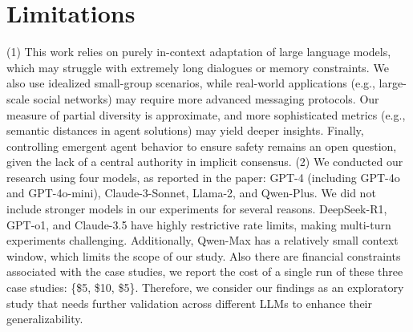 \section*{Limitations}
(1) This work relies on purely in-context adaptation of large language models, which may struggle with extremely long dialogues or memory constraints. We also use idealized small-group scenarios, while real-world applications (e.g., large-scale social networks) may require more advanced messaging protocols. Our measure of partial diversity is approximate, and more sophisticated metrics (e.g., semantic distances in agent solutions) may yield deeper insights. Finally, controlling emergent agent behavior to ensure safety remains an open question, given the lack of a central authority in implicit consensus. (2) We conducted our research using four models, as reported in the paper: GPT-4 (including GPT-4o and GPT-4o-mini), Claude-3-Sonnet, Llama-2, and Qwen-Plus. We did not include stronger models in our experiments for several reasons. DeepSeek-R1, GPT-o1, and Claude-3.5 have highly restrictive rate limits, making multi-turn experiments challenging. Additionally, Qwen-Max has a relatively small context window, which limits the scope of our study. Also there are financial constraints associated with the case studies, we report the cost of a single run of these three case studies: \{\$5, \$10, \$5\}. Therefore, we consider our findings as an exploratory study that needs further validation across different LLMs to enhance their generalizability.

